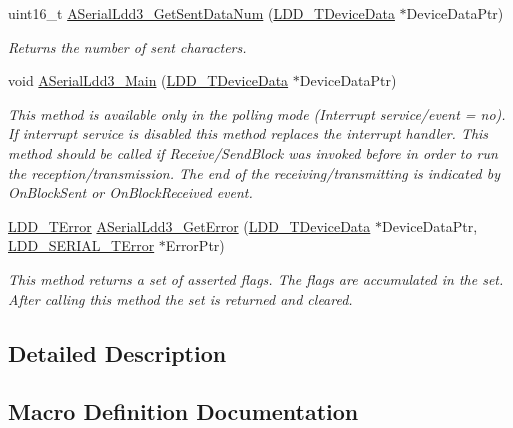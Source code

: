 \begin{DoxyCompactItemize}
uint16\+\_\+t \hyperlink{group___a_serial_ldd3__module_gace789c8aece8f52c0d0cf425d546dab6}{A\+Serial\+Ldd3\+\_\+\+Get\+Sent\+Data\+Num} (\hyperlink{group___p_e___types__module_gac5cf1362f1f0e3a2ce71b1bf2276d091}{L\+D\+D\+\_\+\+T\+Device\+Data} $\ast$Device\+Data\+Ptr)
\begin{DoxyCompactList}\small\item\em Returns the number of sent characters. \end{DoxyCompactList}\item 
void \hyperlink{group___a_serial_ldd3__module_gab183715b7205fdc6f1290dfa1bd57990}{A\+Serial\+Ldd3\+\_\+\+Main} (\hyperlink{group___p_e___types__module_gac5cf1362f1f0e3a2ce71b1bf2276d091}{L\+D\+D\+\_\+\+T\+Device\+Data} $\ast$Device\+Data\+Ptr)
\begin{DoxyCompactList}\small\item\em This method is available only in the polling mode (Interrupt service/event = \textquotesingle{}no\textquotesingle{}). If interrupt service is disabled this method replaces the interrupt handler. This method should be called if Receive/\+Send\+Block was invoked before in order to run the reception/transmission. The end of the receiving/transmitting is indicated by On\+Block\+Sent or On\+Block\+Received event. \end{DoxyCompactList}\item 
\hyperlink{group___p_e___types__module_ga24c2b045fd04e79e85f261ce4df35588}{L\+D\+D\+\_\+\+T\+Error} \hyperlink{group___a_serial_ldd3__module_ga10af10bc94cda0207ddf457c72d3ccc4}{A\+Serial\+Ldd3\+\_\+\+Get\+Error} (\hyperlink{group___p_e___types__module_gac5cf1362f1f0e3a2ce71b1bf2276d091}{L\+D\+D\+\_\+\+T\+Device\+Data} $\ast$Device\+Data\+Ptr, \hyperlink{group___p_e___types__module_ga3bd5d57e02458ce220540d0ad0462e06}{L\+D\+D\+\_\+\+S\+E\+R\+I\+A\+L\+\_\+\+T\+Error} $\ast$Error\+Ptr)
\begin{DoxyCompactList}\small\item\em This method returns a set of asserted flags. The flags are accumulated in the set. After calling this method the set is returned and cleared. \end{DoxyCompactList}\end{DoxyCompactItemize}


\subsection{Detailed Description}


\subsection{Macro Definition Documentation}
